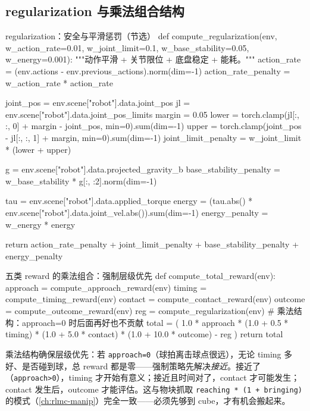 \subsection{regularization 与乘法组合结构}

\begin{codebox}[Python]{regularization：安全与平滑惩罚（节选）}
def compute_regularization(env, w_action_rate=0.01, w_joint_limit=0.1,
                           w_base_stability=0.05, w_energy=0.001):
    """动作平滑 + 关节限位 + 底盘稳定 + 能耗。"""
    action_rate = (env.actions - env.previous_actions).norm(dim=-1)
    action_rate_penalty = w_action_rate * action_rate

    joint_pos = env.scene["robot"].data.joint_pos
    jl = env.scene["robot"].data.joint_pos_limits
    margin = 0.05
    lower = torch.clamp(jl[:, :, 0] + margin - joint_pos, min=0).sum(dim=-1)
    upper = torch.clamp(joint_pos - jl[:, :, 1] + margin, min=0).sum(dim=-1)
    joint_limit_penalty = w_joint_limit * (lower + upper)

    g = env.scene["robot"].data.projected_gravity_b
    base_stability_penalty = w_base_stability * g[:, :2].norm(dim=-1)

    tau = env.scene["robot"].data.applied_torque
    energy = (tau.abs() * env.scene["robot"].data.joint_vel.abs()).sum(dim=-1)
    energy_penalty = w_energy * energy

    return action_rate_penalty + joint_limit_penalty + base_stability_penalty + energy_penalty
\end{codebox}

\begin{codebox}[Python]{五类 reward 的乘法组合：强制层级优先}
def compute_total_reward(env):
    approach = compute_approach_reward(env)
    timing = compute_timing_reward(env)
    contact = compute_contact_reward(env)
    outcome = compute_outcome_reward(env)
    reg = compute_regularization(env)
    # 乘法结构：approach=0 时后面再好也不贡献
    total = (
        1.0 * approach
        * (1.0 + 0.5 * timing)
        * (1.0 + 5.0 * contact)
        * (1.0 + 10.0 * outcome)
        - reg
    )
    return total
\end{codebox}

\begin{insight}[乘法组合把稀疏目标拆成有序可学的台阶]\label{ins:rlmc-strike-multiplicative}
乘法结构确保层级优先：若 \verb|approach=0|（球拍离击球点很远），无论 timing 多好、是否碰到球，总 reward 都是零——强制策略先解决\emph{接近}。接近了（\verb|approach>0|），timing 才开始有意义；接近且时间对了，contact 才可能发生；contact 发生后，outcome 才能评估。这与物块抓取 \verb|reaching * (1 + bringing)| 的模式（\cref{ch:rlmc-manip}）完全一致——必须先够到 cube，才有机会搬起来。
\end{insight}

